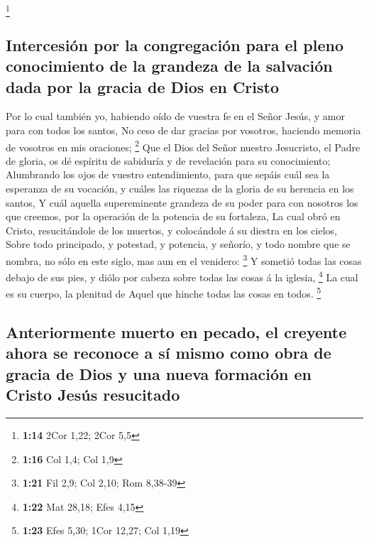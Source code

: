 \footnote{\textbf{1:14} 2Cor 1,22; 2Cor 5,5}

\hypertarget{intercesiuxf3n-por-la-congregaciuxf3n-para-el-pleno-conocimiento-de-la-grandeza-de-la-salvaciuxf3n-dada-por-la-gracia-de-dios-en-cristo}{%
\subsection{Intercesión por la congregación para el pleno conocimiento
de la grandeza de la salvación dada por la gracia de Dios en
Cristo}\label{intercesiuxf3n-por-la-congregaciuxf3n-para-el-pleno-conocimiento-de-la-grandeza-de-la-salvaciuxf3n-dada-por-la-gracia-de-dios-en-cristo}}

 Por lo cual también yo, habiendo oído de vuestra fe en
el Señor Jesús, y amor para con todos los santos,  No
ceso de dar gracias por vosotros, haciendo memoria de vosotros en mis
oraciones; \footnote{\textbf{1:16} Col 1,4; Col 1,9}  Que
el Dios del Señor nuestro Jesucristo, el Padre de gloria, os dé espíritu
de sabiduría y de revelación para su conocimiento; 
Alumbrando los ojos de vuestro entendimiento, para que sepáis cuál sea
la esperanza de su vocación, y cuáles las riquezas de la gloria de su
herencia en los santos,  Y cuál aquella supereminente
grandeza de su poder para con nosotros los que creemos, por la operación
de la potencia de su fortaleza,  La cual obró en Cristo,
resucitándole de los muertos, y colocándole á su diestra en los cielos,
 Sobre todo principado, y potestad, y potencia, y
señorío, y todo nombre que se nombra, no sólo en este siglo, mas aun en
el venidero: \footnote{\textbf{1:21} Fil 2,9; Col 2,10; Rom 8,38-39}
 Y sometió todas las cosas debajo de sus pies, y diólo
por cabeza sobre todas las cosas á la iglesia, \footnote{\textbf{1:22}
  Mat 28,18; Efes 4,15}  La cual es su cuerpo, la
plenitud de Aquel que hinche todas las cosas en todos. \footnote{\textbf{1:23}
  Efes 5,30; 1Cor 12,27; Col 1,19}

\hypertarget{anteriormente-muerto-en-pecado-el-creyente-ahora-se-reconoce-a-suxed-mismo-como-obra-de-gracia-de-dios-y-una-nueva-formaciuxf3n-en-cristo-jesuxfas-resucitado}{%
\subsection{Anteriormente muerto en pecado, el creyente ahora se
reconoce a sí mismo como obra de gracia de Dios y una nueva formación en
Cristo Jesús
resucitado}\label{anteriormente-muerto-en-pecado-el-creyente-ahora-se-reconoce-a-suxed-mismo-como-obra-de-gracia-de-dios-y-una-nueva-formaciuxf3n-en-cristo-jesuxfas-resucitado}}

